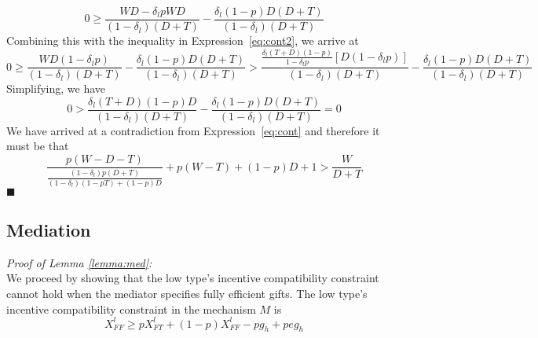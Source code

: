 \documentclass[12pt, letterpaper]{article}
\newcommand{\de}{\delta}
\begin{document}
{%
\begin{equation*}
	0 \geq \frac{WD - \de_lpWD}{\left(1-\de_l\right)\left(D +	 T\right)} 
	- \frac{\de_l (1-p)D\left(D +	 T\right)}{\left(1-\de_l\right)\left(D +	 T\right)}
\end{equation*}
Combining this with the inequality in Expression~\ref{eq:cont2}, we arrive at
\begin{equation*}
	0 \geq \frac{WD(1- \de_lp)}{\left(1-\de_l\right)\left(D +	 T\right)} 
	- \frac{\de_l (1-p)D\left(D +	 T\right)}{\left(1-\de_l\right)\left(D +	 T\right)} > \frac{\frac{\de_l(T+D)(1-p)}{1-\de_l p}\left[D(1 - \de_lp)\right]}{\left(1-\de_l\right)\left(D +	 T\right)} 
	- \frac{\de_l (1-p)D\left(D +	 T\right)}{\left(1-\de_l\right)\left(D +	 T\right)}
\end{equation*}
Simplifying, we have
\begin{equation*}
	0 > \frac{\de_l(T+D)(1-p)D}{\left(1-\de_l\right)\left(D +	 T\right)} 
	- \frac{\de_l (1-p)D\left(D +	 T\right)}{\left(1-\de_l\right)\left(D +	 T\right)} = 0
\end{equation*}
We have arrived at a contradiction from Expression~\ref{eq:cont} and therefore it must be that 
\begin{equation}
	\frac{p(W-D-T)}{\frac{\left(1-\de_l\right)p\left(D +	 T\right)}{\left(1-\de_l\right)\left(1 - pT \right) + (1-p) D}} + p (W-T) + (1-p)D + 1 > \frac{W}{D+T}
\end{equation}
 \hfill $\blacksquare$ 

\subsection{Mediation}
\emph{Proof of Lemma \ref{lemma:med}:}\\
We proceed by showing that the low type's incentive compatibility constraint cannot hold when the mediator specifies fully efficient gifts. The low type's incentive compatibility constraint in the mechanism $M$ is
$$X_{FF}^l \geq pX_{FT}^l+(1-p)X_{FF}^l-pg_h+peg_h $$

}
\end{document}
